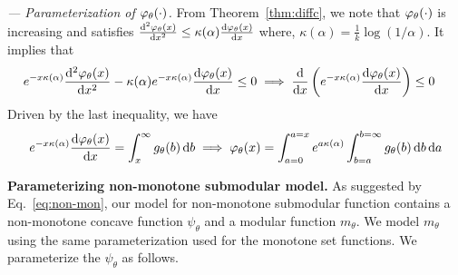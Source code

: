 \documentclass{article}
\newcommand{\ehdr}[1]{\noindent\emph{#1.}}
\newcommand{\xhdr}[1]{\noindent\textbf{#1.}}
\def\d{\mathrm{d}}
\newcommand{\ttc}{\diffc_{\theta}}
\newcommand{\ga}{\kappa(\alpha)}
\newcommand{\galphat}{g_{\theta}}
\begin{document}
\ehdr{--- Parameterization of $\varphi_{\theta}(\cdot)$}
From Theorem~\ref{thm:diffc}, we note that $\ttc(\cdot)$ is increasing and satisfies 
  $\frac{\d ^2 \ttc(x)}{\d x^2} \le \ga\frac{\d  \ttc(x)}{\d x}$
where, $\ga = \frac{1}{k}\log\left( {1}/{\alpha}\right)$. 
It implies that
\begin{align}
&  e^{-x \ga} \frac{\d ^2 \ttc(x)}{\d x^2}-  \ga e^{-x \ga}\frac{\d  \ttc(x)}{\d x} \le 0  \implies \frac{\d}{\d x}\left(e^{-x \ga} \frac{  \d  \ttc(x) }  {\d x} \right) \le 0
\end{align}
Driven by the last inequality, we have
\begin{align}
e^{-x \ga}\frac{  \d  \ttc(x) } {\d x} = \int_{x} ^{\infty} \galphat(b)\, \d b 
\implies \ttc(x) =   \int_{a=0} ^{a=x}   e^{a\ga  } \int_{b= a} ^{b= \infty} \galphat(b)\, \d b\,  \d a \label{eq:phiam}
\end{align}

 
\xhdr{Parameterizing non-monotone submodular model} As suggested by Eq.~\eqref{eq:non-mon}, 
our model for non-monotone submodular function contains a non-monotone concave function $\psi_{\theta}$ and a modular function $m_{\theta}$. We model $m_{\theta}$ using the same parameterization used for the monotone set functions. We parameterize the $\psi_{\theta}$ as follows.
\end{document}
